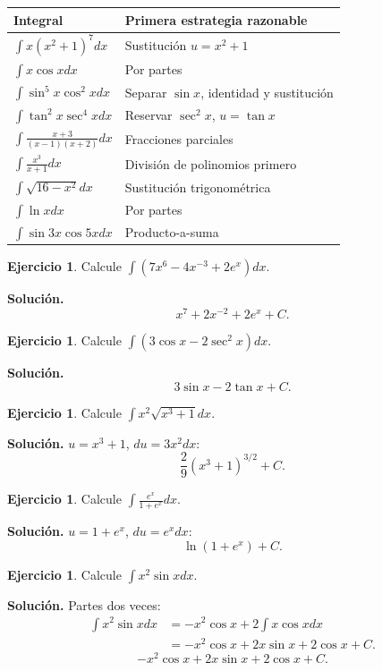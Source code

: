 \documentclass[12pt]{article}
\theoremstyle{definition}
\newtheorem{ejercicio}[teorema]{Ejercicio}
\theoremstyle{remark}
\begin{document}
\begin{center}\begin{longtable}{p{}p{}}\toprule
Integral & Primera estrategia razonable\\\midrule
$\int x(x^2+1)^7dx$ & Sustitución $u=x^2+1$\\
$\int x\cos xdx$ & Por partes\\
$\int\sin^5x\cos^2xdx$ & Separar $\sin x$, identidad y sustitución\\
$\int\tan^2x\sec^4xdx$ & Reservar $\sec^2x$, $u=\tan x$\\
$\int\frac{x+3}{(x-1)(x+2)}dx$ & Fracciones parciales\\
$\int\frac{x^3}{x+1}dx$ & División de polinomios primero\\
$\int\sqrt{16-x^2}dx$ & Sustitución trigonométrica\\
$\int\ln xdx$ & Por partes\\
$\int\sin3x\cos5xdx$ & Producto-a-suma\\\bottomrule
\end{longtable}\end{center}



\begin{ejercicio}Calcule $\int(7x^6-4x^{-3}+2e^x)dx$.\end{ejercicio}
\textbf{Solución.}
\[\boxed{x^7+2x^{-2}+2e^x+C}.\]
\begin{ejercicio}Calcule $\int(3\cos x-2\sec^2x)dx$.\end{ejercicio}
\textbf{Solución.}
\[\boxed{3\sin x-2\tan x+C}.\]

\begin{ejercicio}Calcule $\int x^2\sqrt{x^3+1}dx$.\end{ejercicio}
\textbf{Solución.} $u=x^3+1$, $du=3x^2dx$:
\[\boxed{\frac{2}{9}(x^3+1)^{3/2}+C}.\]

\begin{ejercicio}Calcule $\int\frac{e^x}{1+e^x}dx$.\end{ejercicio}
\textbf{Solución.} $u=1+e^x$, $du=e^xdx$:
\[\boxed{\ln(1+e^x)+C}.\]

\begin{ejercicio}Calcule $\int x^2\sin xdx$.\end{ejercicio}
\textbf{Solución.} Partes dos veces:
\begin{align*}
\int x^2\sin xdx&=-x^2\cos x+2\int x\cos xdx\\
&=-x^2\cos x+2x\sin x+2\cos x+C.
\end{align*}
\[\boxed{-x^2\cos x+2x\sin x+2\cos x+C}.\]
\end{document}
